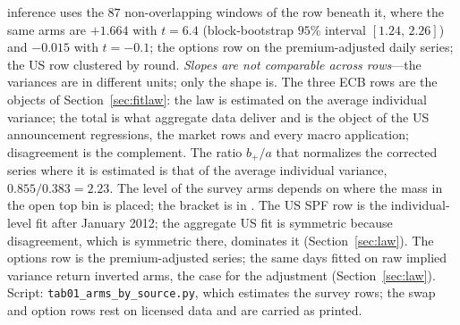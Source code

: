\begin{table}[!htbp]
{inference uses the $87$ non-overlapping windows of the row beneath it, where the same arms
are $+1.664$ with $t=6.4$ (block-bootstrap $95\%$ interval $[1.24,\,2.26]$) and $-0.015$
with $t=-0.1$; the options row on the premium-adjusted daily series; the US row clustered by round. \emph{Slopes are
not comparable across rows}---the variances are in different units; only the shape is. The
three ECB rows are the objects of Section~\ref{sec:fitlaw}: the law is estimated on the average
individual variance; the total is what aggregate data deliver and is the object of the US
announcement regressions, the market rows and every macro application; disagreement is the
complement. The ratio $b_+/a$ that normalizes the corrected series where it is estimated is that of the average individual variance, $0.855/0.383=2.23$. The level of the survey arms depends on where the mass in the open top bin is
placed; the bracket is in \citet{vansteenberghe2026uncertain}. The
US SPF row is the individual-level fit after January 2012; the aggregate US fit is
symmetric because disagreement, which is symmetric there, dominates it
(Section~\ref{sec:law}). The options row is the premium-adjusted series; the same days
fitted on raw implied variance return inverted arms, the case for the adjustment
(Section~\ref{sec:law}). Script: \texttt{tab01\_arms\_by\_source.py}, which estimates the
survey rows; the swap and option rows rest on licensed data and are carried as printed.}
\end{table}
